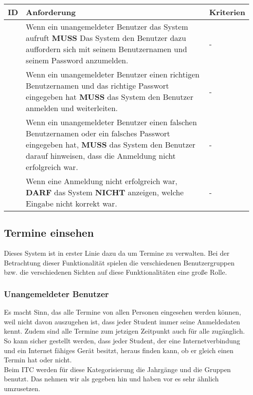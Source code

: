 \vspace{12pt}

\begin{tabular} {|p{}|p{}|p{}|}
	\hline
	ID & Anforderung & Kriterien \\
	\hline
	\printfreqnr
	& Wenn ein unangemeldeter Benutzer das System aufruft \textbf{MUSS} Das System den Benutzer dazu auffordern sich mit seinem Benutzernamen und seinem Password anzumelden.
	& - \\
	\hline
	\printfreqnr
	& Wenn ein unangemeldeter Benutzer einen richtigen Benutzernamen und das richtige Passwort eingegeben hat \textbf{MUSS} das System den Benutzer anmelden und weiterleiten.
	& -  \\
	\hline
	\printfreqnr
	& Wenn ein unangemeldeter Benutzer einen falschen Benutzernamen oder ein falsches Passwort eingegeben hat, \textbf{MUSS} das System den Benutzer darauf hinweisen, dass die Anmeldung nicht erfolgreich war.
	& - \\
	\hline
	\printfreqnr
	& Wenn eine Anmeldung nicht erfolgreich war, \textbf{DARF} das System \textbf{NICHT} anzeigen, welche Eingabe nicht korrekt war.
	& - \\
	\hline
\end{tabular}

\newpage

\subsection{Termine einsehen}
Dieses System ist in erster Linie dazu da um Termine zu verwalten. Bei der Betrachtung dieser Funktionalität spielen die verschiedenen Benutzergruppen bzw. die verschiedenen Sichten auf diese Funktionalitäten eine große Rolle. 

\vspace{12pt}

\subsubsection{Unangemeldeter Benutzer}
Es macht Sinn, das alle Termine von allen Personen eingesehen werden können, weil nicht davon auszugehen ist, dass jeder Student immer seine Anmeldedaten kennt. Zudem sind alle Termine zum jetzigen Zeitpunkt auch für alle zugänglich. So kann sicher gestellt werden, dass jeder Student, der eine Internetverbindung und ein Internet fähiges Gerät besitzt, heraus finden kann, ob er gleich einen Termin hat oder nicht. \\
Beim ITC werden für diese Kategorisierung die Jahrgänge und die Gruppen benutzt. Das nehmen wir als gegeben hin und haben vor es sehr ähnlich umzusetzen.

